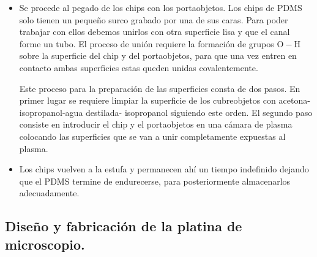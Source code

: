 \begin{itemize}
\item Se procede al pegado de los chips con los portaobjetos. Los chips de PDMS solo tienen un pequeño surco grabado por una de sus caras. Para poder trabajar con ellos debemos unirlos con otra superficie lisa y que el canal forme un tubo. El proceso de unión requiere la formación de grupos $\mathrm{O-H}$ sobre la superficie del chip y del portaobjetos, para que una vez entren en contacto ambas superficies estas queden unidas covalentemente.
 
Este proceso para la preparación de las superficies consta de dos pasos. En primer lugar se requiere limpiar la superficie de los cubreobjetos con acetona-isopropanol-agua destilada- isopropanol siguiendo este orden. El segundo paso consiste en introducir el chip y el portaobjetos en una cámara de plasma colocando las superficies que se van a unir completamente expuestas al plasma.
 
\item Los chips vuelven a la estufa y permanecen ahí un tiempo indefinido dejando que el PDMS termine de endurecerse, para posteriormente almacenarlos adecuadamente.
 
\end{itemize}

\subsection{Diseño y fabricación de la platina de microscopio.}


